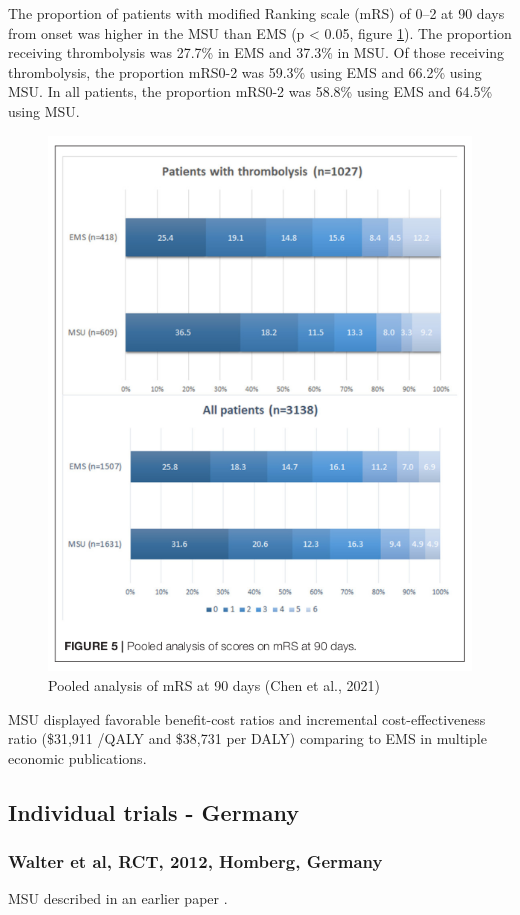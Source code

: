 The proportion of patients with modified Ranking scale (mRS) of 0–2 at 90 days from onset was higher in the MSU than EMS (p < 0.05, figure \ref{fig:background_chen_fig_5}). The proportion receiving thrombolysis was 27.7\% in EMS and 37.3\% in MSU. Of those receiving thrombolysis, the proportion mRS0-2 was 59.3\% using EMS and 66.2\% using MSU. In all patients, the proportion mRS0-2 was 58.8\% using EMS and 64.5\% using MSU.

\begin{figure}
    \centering
    \includegraphics[width=0.5\linewidth]{images_background/chen_fig_5}
    \caption{Pooled analysis of mRS at 90 days (Chen et al., 2021)}
    \label{fig:background_chen_fig_5}
\end{figure}

MSU displayed favorable benefit-cost ratios and incremental cost-effectiveness ratio (\$31,911 /QALY and \$38,731 per DALY) comparing to EMS in multiple economic publications.


\subsection{Individual trials - Germany}

\subsubsection{Walter et al, RCT, 2012, Homberg, Germany \cite{walter_diagnosis_2012}}

MSU described in an earlier paper \cite{walter_bringing_2010}.

